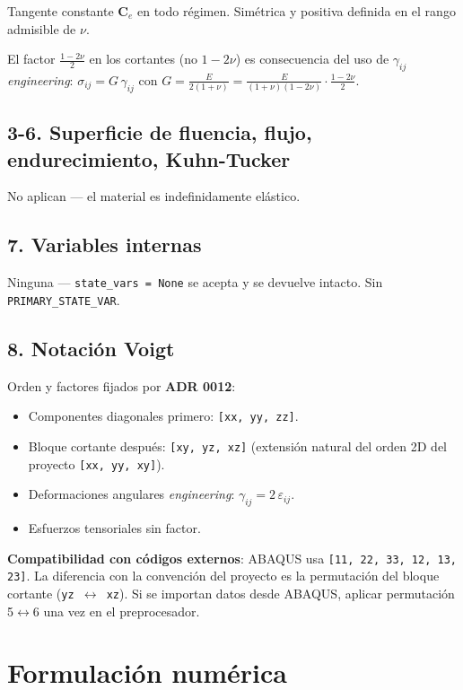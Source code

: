 \documentclass[11pt,letterpaper,oneside]{report}
\begin{document}
Tangente constante $\mathbf C_e$ en todo régimen. Simétrica y positiva definida en el rango admisible de $\nu$.

El factor $\tfrac{1-2\nu}{2}$ en los cortantes (no $1-2\nu$) es consecuencia del uso de $\gamma_{ij}$ \textit{engineering}: $\sigma_{ij} = G\,\gamma_{ij}$ con $G = \tfrac{E}{2(1+\nu)} = \tfrac{E}{(1+\nu)(1-2\nu)}\cdot\tfrac{1-2\nu}{2}$.

\subsection{3-6. Superficie de fluencia, flujo, endurecimiento, Kuhn-Tucker}

No aplican --- el material es indefinidamente elástico.

\subsection{7. Variables internas}

Ninguna --- \texttt{state\_vars = None} se acepta y se devuelve intacto. Sin \texttt{PRIMARY\_STATE\_VAR}.

\subsection{8. Notación Voigt}

Orden y factores fijados por \textbf{ADR 0012}:

\begin{itemize}
  \item Componentes diagonales primero: \texttt{[xx, yy, zz]}.
  \item Bloque cortante después: \texttt{[xy, yz, xz]} (extensión natural del orden 2D del proyecto \texttt{[xx, yy, xy]}).
  \item Deformaciones angulares \textit{engineering}: $\gamma_{ij} = 2\,\varepsilon_{ij}$.
  \item Esfuerzos tensoriales sin factor.
\end{itemize}

\textbf{Compatibilidad con códigos externos}: ABAQUS usa \texttt{[11, 22, 33, 12, 13, 23]}. La diferencia con la convención del proyecto es la permutación del bloque cortante (\texttt{yz \ensuremath{\leftrightarrow} xz}). Si se importan datos desde ABAQUS, aplicar permutación 5\ensuremath{\leftrightarrow}6 una vez en el preprocesador.


\section{Formulación numérica}
\end{document}
